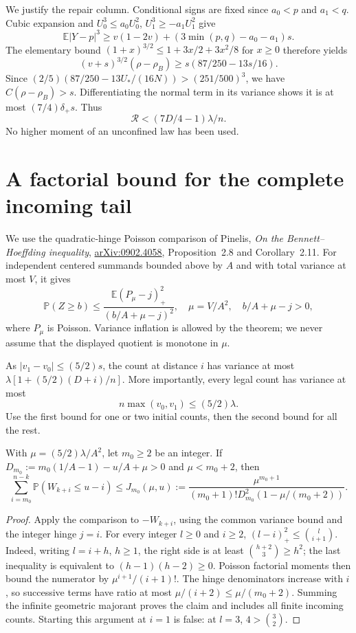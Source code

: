 \documentclass[11pt]{article}
\newcommand{\E}{\mathbb E}\newcommand{\Pp}{\mathbb P}
\begin{document}
We justify the repair column. Conditional signs are fixed since
$a_0<p$ and $a_1<q$. Cubic expansion and $U_0^3\le a_0U_0^2$,
$U_1^3\ge-a_1U_1^2$ give
\[
 \E|Y-p|^3\ge v(1-2v)+(3\min(p,q)-a_0-a_1)s.
\]
The elementary bound $(1+x)^{3/2}\le1+3x/2+3x^2/8$ for $x\ge0$
therefore yields
\[
 (v+s)^{3/2}(\rho-\rho_B)
 \ge s(87/250-13s/16).
\]
Since $(2/5)(87/250-13U_*/(16N))>(251/500)^3$, we have
$C(\rho-\rho_B)>s$. Differentiating the normal term in its variance
shows it is at most $(7/4)\delta_+s$. Thus
\begin{equation}\label{eq:repair}
 \mathcal R<(7D/4-1)\lambda/n.
\end{equation}
No higher moment of an unconfined law has been used.

\section{A factorial bound for the complete incoming tail}
We use the quadratic-hinge Poisson comparison of Pinelis,
\emph{On the Bennett--Hoeffding inequality},
\href{https://arxiv.org/abs/0902.4058}{arXiv:0902.4058},
Proposition~2.8 and Corollary~2.11. For independent centered summands
bounded above by $A$ and with total variance at most $V$, it gives
\[
 \Pp(Z\ge b)\le
 \frac{\E(P_\mu-j)_+^2}{(b/A+\mu-j)^2},
 \quad \mu=V/A^2,\quad b/A+\mu-j>0,
\]
where $P_\mu$ is Poisson. Variance inflation is allowed by the theorem;
we never assume that the displayed quotient is monotone in $\mu$.

As $|v_1-v_0|\le(5/2)s$, the count at distance $i$ has variance
at most $\lambda[1+(5/2)(D+i)/n]$. More importantly, every legal
count has variance at most
\begin{equation}\label{eq:commonvariance}
 n\max(v_0,v_1)\le(5/2)\lambda.
\end{equation}
Use the first bound for one or two initial counts, then the second
bound for all the rest.

\begin{lemma}\label{lem:tail}
With $\mu=(5/2)\lambda/A^2$, let $m_0\ge2$ be an integer.
If $D_{m_0}:=m_0(1/A-1)-u/A+\mu>0$ and $\mu<m_0+2$, then
\[
 \sum_{i=m_0}^{n-k}\Pp(W_{k+i}\le u-i)
 \le J_{m_0}(\mu,u):=
 \frac{\mu^{m_0+1}}
 {(m_0+1)!D_{m_0}^2(1-\mu/(m_0+2))}.
\]
\end{lemma}
\begin{proof}
Apply the comparison to $-W_{k+i}$, using the common variance bound
and the integer hinge $j=i$. For every integer $l\ge0$ and $i\ge2$,
$(l-i)_+^2\le\binom l{i+1}$. Indeed, writing $l=i+h$, $h\ge1$,
the right side is at least $\binom{h+2}{3}\ge h^2$; the last
inequality is equivalent to $(h-1)(h-2)\ge0$.
Poisson factorial moments then bound the numerator by
$\mu^{i+1}/(i+1)!$. The hinge denominators increase with $i$,
so successive terms have ratio at most $\mu/(i+2)\le\mu/(m_0+2)$.
Summing the infinite geometric majorant proves the claim and includes
all finite incoming counts. Starting this argument at $i=1$ is false:
at $l=3$, $4>\binom32$.
\end{proof}
\end{document}
